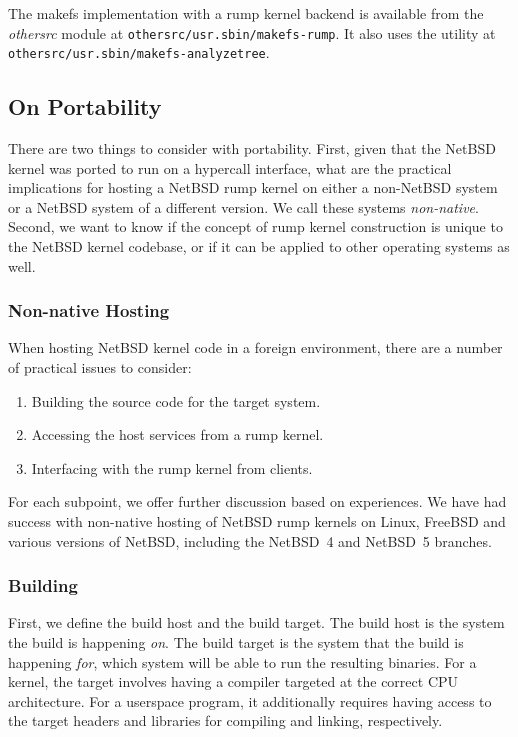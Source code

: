 The makefs implementation with a rump kernel backend is available
from the \textit{othersrc} module
at \texttt{othersrc/usr.sbin/makefs-rump}.  It also uses the utility at
\texttt{othersrc/usr.sbin/makefs-analyzetree}.

\subsection{On Portability}

There are two things to consider with portability.  First, given that
the NetBSD kernel was ported to run on a hypercall interface, what
are the practical implications for hosting a NetBSD rump kernel on
either a non-NetBSD system or a NetBSD system of a different version.
We call these systems \textit{non-native}.  Second, we want to know if
the concept of rump kernel construction is unique to the NetBSD kernel
codebase, or if it can be applied to other operating systems as well.

\subsubsection{Non-native Hosting}
\label{sect:foreignhost}

When hosting NetBSD kernel code in a foreign environment, there are a
number of practical issues to consider:

\begin{enumerate}
\item	Building the source code for the target system.
\item	Accessing the host services from a rump kernel.
\item   Interfacing with the rump kernel from clients.
\end{enumerate}

For each subpoint, we offer further discussion based on experiences.
We have had success with non-native hosting of NetBSD rump kernels
on Linux, FreeBSD and various versions of NetBSD, including the
NetBSD~4 and NetBSD~5 branches.

\subsubsection*{Building}

First, we define the build host and the build target.  The build
host is the system the build is happening \textit{on}.  The build
target is the system that the build is happening \textit{for}, \ie
which system will be able to run the resulting binaries.  For a
kernel, the target involves having a compiler targeted at the
correct CPU architecture.  For a userspace program, it additionally
requires having access to the target headers and libraries for
compiling and linking, respectively.

